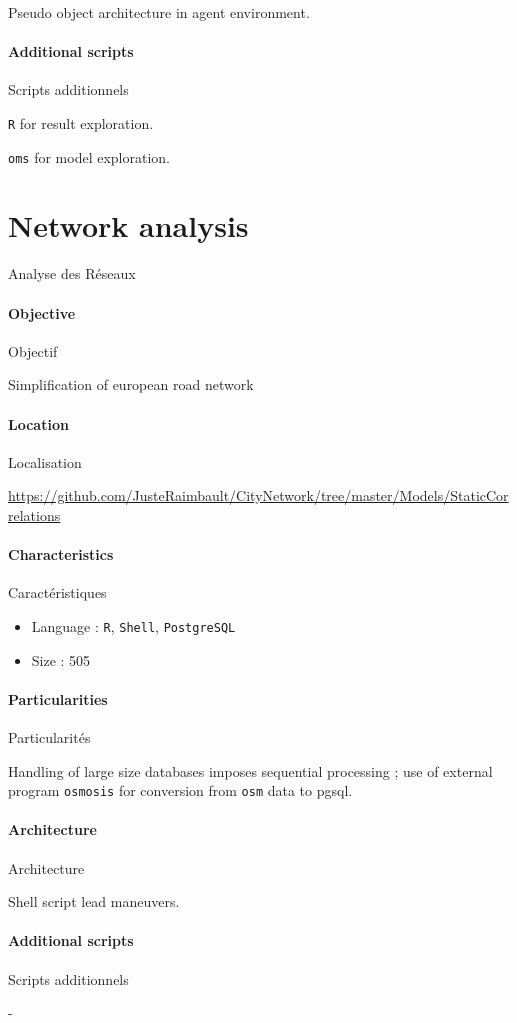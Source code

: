 Pseudo object architecture in agent environment.

\paragraph{Additional scripts}{Scripts additionnels}

\texttt{R} for result exploration.

\texttt{oms} for model exploration.






\section{Network analysis}{Analyse des Réseaux}

\paragraph{Objective}{Objectif}

Simplification of european road network

\paragraph{Location}{Localisation}

\url{https://github.com/JusteRaimbault/CityNetwork/tree/master/Models/StaticCorrelations}

\paragraph{Characteristics}{Caractéristiques}

\begin{itemize}
\item Language : \texttt{R}, \texttt{Shell}, \texttt{PostgreSQL}
\item Size : 505
\end{itemize}


\paragraph{Particularities}{Particularités}

Handling of large size databases imposes sequential processing ; use of external program \texttt{osmosis} for conversion from \texttt{osm} data to pgsql.

\paragraph{Architecture}{Architecture}

Shell script lead maneuvers.

\paragraph{Additional scripts}{Scripts additionnels}

-



